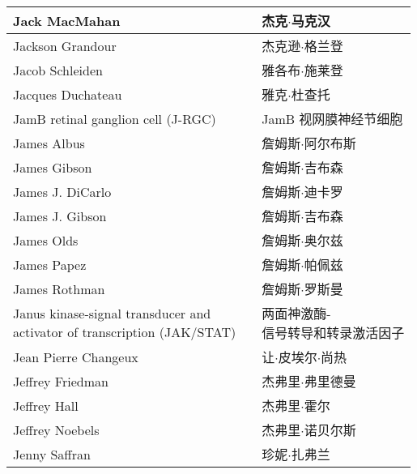 \begin{longtable}{lll}
	\midrule
	Jack MacMahan   && 杰克$\cdot$马克汉  \\
	
	\midrule
	Jackson Grandour   && 杰克逊$\cdot$格兰登  \\
	
	\midrule
	Jacob Schleiden   && 雅各布$\cdot$施莱登  \\
	
	\midrule
	Jacques Duchateau   && 雅克$\cdot$杜查托  \\
	
	\midrule
	JamB retinal ganglion cell (J-RGC)   && JamB 视网膜神经节细胞  \\
	
	\midrule
	James Albus   && 詹姆斯$\cdot$阿尔布斯  \\
	
	\midrule
	James Gibson   && 詹姆斯$\cdot$吉布森  \\
	
	\midrule
	James J. DiCarlo   && 詹姆斯$\cdot$迪卡罗  \\
	
	\midrule
	James J. Gibson   && 詹姆斯$\cdot$吉布森  \\
	
	\midrule
	James Olds   && 詹姆斯$\cdot$奥尔兹  \\
	
	\midrule
	James Papez   && 詹姆斯$\cdot$帕佩兹  \\
	
	\midrule
	James Rothman   && 詹姆斯$\cdot$罗斯曼  \\
	
	\midrule
	\makecell[l]{Janus kinase-signal transducer and \\activator of transcription (JAK/STAT)}  && \makecell[l]{两面神激酶-\\信号转导和转录激活因子}  \\
	
	\midrule
	Jean Pierre Changeux   && 让$\cdot$皮埃尔$\cdot$尚热  \\
	
	\midrule
	Jeffrey Friedman   && 杰弗里$\cdot$弗里德曼  \\
	
	\midrule
	Jeffrey Hall   && 杰弗里$\cdot$霍尔  \\
	
	\midrule
	Jeffrey Noebels   && 杰弗里$\cdot$诺贝尔斯  \\
	
	\midrule
	Jenny Saffran   && 珍妮$\cdot$扎弗兰  \\
	

\end{longtable}
